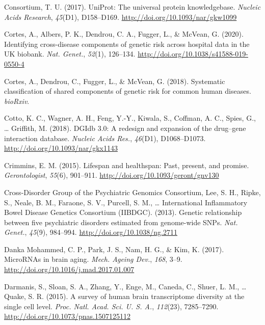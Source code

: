 \documentclass[12pt,twoside]{unicam}
\begin{document}
\begin{cslreferences}
\leavevmode\hypertarget{ref-Consortium2017}{}%
Consortium, T. U. (2017). UniProt: The universal protein knowledgebase. \emph{Nucleic Acids Research}, \emph{45}(D1), D158--D169. \url{http://doi.org/10.1093/nar/gkw1099}

\leavevmode\hypertarget{ref-Cortes2020}{}%
Cortes, A., Albers, P. K., Dendrou, C. A., Fugger, L., \& McVean, G. (2020). Identifying cross-disease components of genetic risk across hospital data in the UK biobank. \emph{Nat. Genet.}, \emph{52}(1), 126--134. \url{http://doi.org/10.1038/s41588-019-0550-4}

\leavevmode\hypertarget{ref-Cortes2018}{}%
Cortes, A., Dendrou, C., Fugger, L., \& McVean, G. (2018). Systematic classification of shared components of genetic risk for common human diseases. \emph{bioRxiv}.

\leavevmode\hypertarget{ref-Cotto2018}{}%
Cotto, K. C., Wagner, A. H., Feng, Y.-Y., Kiwala, S., Coffman, A. C., Spies, G., \ldots{} Griffith, M. (2018). DGIdb 3.0: A redesign and expansion of the drug--gene interaction database. \emph{Nucleic Acids Res.}, \emph{46}(D1), D1068--D1073. \url{http://doi.org/10.1093/nar/gkx1143}

\leavevmode\hypertarget{ref-Crimmins2015}{}%
Crimmins, E. M. (2015). Lifespan and healthspan: Past, present, and promise. \emph{Gerontologist}, \emph{55}(6), 901--911. \url{http://doi.org/10.1093/geront/gnv130}

\leavevmode\hypertarget{ref-Cross-Disorder_Group_of_the_Psychiatric_Genomics_Consortium2013}{}%
Cross-Disorder Group of the Psychiatric Genomics Consortium, Lee, S. H., Ripke, S., Neale, B. M., Faraone, S. V., Purcell, S. M., \ldots{} International Inflammatory Bowel Disease Genetics Consortium (IIBDGC). (2013). Genetic relationship between five psychiatric disorders estimated from genome-wide SNPs. \emph{Nat. Genet.}, \emph{45}(9), 984--994. \url{http://doi.org/10.1038/ng.2711}

\leavevmode\hypertarget{ref-DankaMohammed2017}{}%
Danka Mohammed, C. P., Park, J. S., Nam, H. G., \& Kim, K. (2017). MicroRNAs in brain aging. \emph{Mech. Ageing Dev.}, \emph{168}, 3--9. \url{http://doi.org/10.1016/j.mad.2017.01.007}

\leavevmode\hypertarget{ref-Darmanis2015}{}%
Darmanis, S., Sloan, S. A., Zhang, Y., Enge, M., Caneda, C., Shuer, L. M., \ldots{} Quake, S. R. (2015). A survey of human brain transcriptome diversity at the single cell level. \emph{Proc. Natl. Acad. Sci. U. S. A.}, \emph{112}(23), 7285--7290. \url{http://doi.org/10.1073/pnas.1507125112}


\end{cslreferences}
\end{document}

